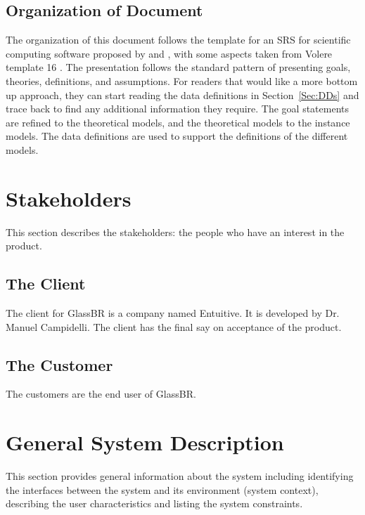 \documentclass[12pt]{article}
\begin{document}
\subsection{Organization of Document}
\label{Sec:DocOrg}
The organization of this document follows the template for an SRS for scientific computing software proposed by \cite{koothoor2013} and \cite{smithLai2005}, with some aspects taken from Volere template 16 \cite{rbrtsn2012}. The presentation follows the standard pattern of presenting goals, theories, definitions, and assumptions. For readers that would like a more bottom up approach, they can start reading the data definitions in Section~\ref{Sec:DDs} and trace back to find any additional information they require.
The goal statements are refined to the theoretical models, and the theoretical models to the instance models. The data definitions are used to support the definitions of the different models.
\section{Stakeholders}
\label{Sec:Stakeholder}
This section describes the stakeholders: the people who have an interest in the product.
\subsection{The Client}
\label{Sec:Client}
The client for GlassBR is a company named Entuitive. It is developed by Dr. Manuel Campidelli. The client has the final say on acceptance of the product.
\subsection{The Customer}
\label{Sec:Customer}
The customers are the end user of GlassBR.
\section{General System Description}
\label{Sec:GenSysDesc}
This section provides general information about the system including identifying the interfaces between the system and its environment (system context), describing the user characteristics and listing the system constraints.
\end{document}
